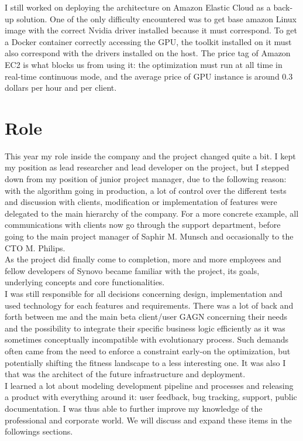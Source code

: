 \documentclass[12pt]{memoir}
\begin{document}
I still worked on deploying the architecture on Amazon Elastic Cloud as a back-up
solution. One of the only difficulty encountered was to get base amazon Linux image with the
correct Nvidia driver installed because it must correspond. To get a Docker
container correctly accessing the GPU, the toolkit installed on it must also
correspond with the drivers installed on the host.
The price tag of Amazon EC2 is what blocks us from using it: the optimization must
run at all time in real-time continuous mode, and the average price of GPU instance
is around 0.3 dollars per hour and per client.

\section{Role}

This year my role inside the company and the project changed quite a bit. I kept
my position as lead researcher and lead developer on the project, but I stepped
down from my position of junior project manager, due to the following reason: with
the algorithm going in production, a lot of control over the different tests and discussion with
clients, modification or implementation of features were delegated to the main
hierarchy of the company. For a more concrete example, all communications with clients now
go through the support department, before going to the main project manager of
Saphir M. Munsch and occasionally to the CTO M. Philips.\\
As the project did finally come to completion, more and more employees and fellow
developers of Synovo became familiar with the project, its goals, underlying
concepts and core functionalities. \\
I was still responsible for all decisions concerning design, implementation
and used technology for each features and requirements. There was a lot of back and
forth between me and the main beta client/user GAGN concerning their needs and
the possibility to integrate their specific business logic efficiently as it was
sometimes conceptually incompatible with evolutionary process. Such demands often
came from the need to enforce a constraint early-on the optimization, but potentially
shifting the fitness landscape to a less interesting one. It was also I that was the
architect of the future infrastructure and deployment. \\
I learned a lot about modeling development pipeline and processes and releasing a
product with everything around it: user feedback, bug tracking, support, public
documentation. I was thus able to further improve my knowledge of the professional
and corporate world. We will discuss and expand these items in the followings sections.
\end{document}

